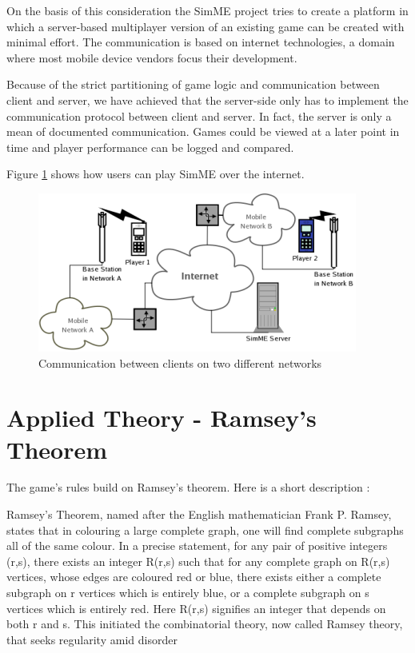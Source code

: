 	On the basis of this consideration the SimME project tries to create a
	platform in which a server-based multiplayer version of an existing game can
	be created with minimal effort. The communication is based on internet
	technologies, a domain where most mobile device vendors focus their
	development.

	Because of the strict partitioning of game logic and communication between
	client and server, we have achieved that the server-side only has to
	implement the communication protocol between client and server. In fact, the
	server is only a mean of documented communication. Games could be viewed at
	a later point in time and player performance can be logged and compared.

	Figure \ref{fig:communication} shows how users can play SimME over the
	internet.

	\begin{figure}[htbp]
		\begin{center}
			\includegraphics{pics/communication-small.png}
			\caption{Communication between clients on two different networks}
			\label{fig:communication}
		\end{center}
	\end{figure}


\section{Applied Theory - Ramsey's Theorem}

	The game's rules build on Ramsey's theorem. Here is a short description
	\cite{wiki}:

	Ramsey's Theorem, named after the English mathematician Frank P. Ramsey,
	states that in colouring a large complete graph, one will find complete
	subgraphs all of the same colour. In a precise statement, for any pair of
	positive integers (r,s), there exists an integer R(r,s) such that for any
	complete graph on R(r,s) vertices, whose edges are coloured red or blue,
	there exists either a complete subgraph on r vertices which is entirely
	blue, or a complete subgraph on s vertices which is entirely red. Here
	R(r,s) signifies an integer that depends on both r and s. This initiated the
	combinatorial theory, now called Ramsey theory, that seeks regularity amid
	disorder

